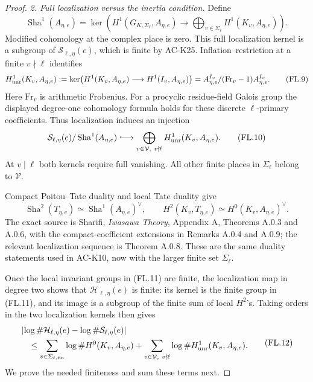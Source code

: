 \begin{proof}
\emph{2. Full localization versus the inertia condition.}
Define
\[
 \operatorname{Sha}^1(A_{\eta,e})=
 \ker\!\left(H^1(G_{K,\Sigma_\ell},A_{\eta,e})
           \longrightarrow
              \bigoplus_{v\in\Sigma_\ell}
                            H^1(K_v,A_{\eta,e})\right).
 \tag{FL.8}
\]
Modified cohomology at the complex place is zero.
This full localization kernel is a subgroup of
\(\mathcal S_{\ell,\eta}(e)\), which is finite by AC-K25.
Inflation--restriction at a finite \(v\nmid\ell\) identifies
\[
 H^1_{\rm unr}(K_v,A_{\eta,e})
   :=\ker\!\left(H^1(K_v,A_{\eta,e})
                        \longrightarrow H^1(I_v,A_{\eta,e})\right)
   = A_{\eta,e}^{I_v}/(\mathrm{Fr}_v-1)A_{\eta,e}^{I_v}.
 \tag{FL.9}
\]
Here \(\mathrm{Fr}_v\) is arithmetic Frobenius.
For a procyclic residue-field Galois group the displayed
degree-one cohomology formula holds for these discrete
\(\ell\)-primary coefficients.
Thus localization induces an injection
\[
 \mathcal S_{\ell,\eta}(e)/\operatorname{Sha}^1(A_{\eta,e})
       \lhook\joinrel\longrightarrow
        \bigoplus_{v\in\mathcal V,\ v\nmid\ell}
                             H^1_{\rm unr}(K_v,A_{\eta,e}).
 \tag{FL.10}
\]
At \(v\mid\ell\) both kernels require full vanishing.
All other finite places in \(\Sigma_\ell\) belong to
\(\mathcal V\).

Compact Poitou--Tate duality and local Tate duality give
\[
 \operatorname{Sha}^2(T_{\eta,e})\simeq\operatorname{Sha}^1(A_{\eta,e})^\vee,\qquad
 H^2(K_v,T_{\eta,e})\simeq H^0(K_v,A_{\eta,e})^\vee .
 \tag{FL.11}
\]
The exact source is Sharifi, \emph{Iwasawa Theory},
Appendix A, Theorems A.0.3 and A.0.6, with the
compact-coefficient extensions in Remarks A.0.4 and A.0.9;
the relevant localization sequence is Theorem A.0.8.
These are the same duality statements used in AC-K10,
now with the larger finite set \(\Sigma_\ell\).

Once the local invariant groups in (FL.11) are finite,
the localization map in degree two shows that
\(\mathcal H_{\ell,\eta}(e)\) is finite: its kernel is
the finite group in (FL.11), and its image is a subgroup
of the finite sum of local \(H^2\)'s.
Taking orders in the two localization kernels then gives
\[
 \begin{split}
 &\left|\log\#\mathcal H_{\ell,\eta}(e)
                  -\log\#\mathcal S_{\ell,\eta}(e)\right|\\
 &\quad\leq
       \sum_{v\in\Sigma_{\ell,\rm fin}}
                              \log\#H^0(K_v,A_{\eta,e})
       +\sum_{v\in\mathcal V,\ v\nmid\ell}
                              \log\#H^1_{\rm unr}(K_v,A_{\eta,e}).
 \end{split}
 \tag{FL.12}
\]
We prove the needed finiteness and sum these terms next.


\end{proof}
